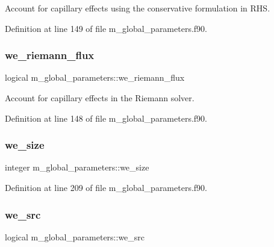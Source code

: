 Account for capillary effects using the conservative formulation in R\+HS. 



Definition at line 149 of file m\+\_\+global\+\_\+parameters.\+f90.

\mbox{\label{namespacem__global__parameters_a99557d578d538a853b5fd9e445ad6303}} 
\subsubsection{\texorpdfstring{we\+\_\+riemann\+\_\+flux}{we\_riemann\_flux}}
{\footnotesize\ttfamily logical m\+\_\+global\+\_\+parameters\+::we\+\_\+riemann\+\_\+flux}



Account for capillary effects in the Riemann solver. 



Definition at line 148 of file m\+\_\+global\+\_\+parameters.\+f90.

\mbox{\label{namespacem__global__parameters_af329319354912b90787e0dff7cdc8a37}} 
\subsubsection{\texorpdfstring{we\+\_\+size}{we\_size}}
{\footnotesize\ttfamily integer m\+\_\+global\+\_\+parameters\+::we\+\_\+size}



Definition at line 209 of file m\+\_\+global\+\_\+parameters.\+f90.

\mbox{\label{namespacem__global__parameters_a897b4f61353235b3af13bac633d5b9a0}} 
\subsubsection{\texorpdfstring{we\+\_\+src}{we\_src}}
{\footnotesize\ttfamily logical m\+\_\+global\+\_\+parameters\+::we\+\_\+src}



